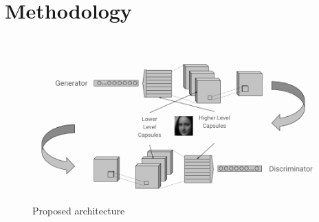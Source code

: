 \chapter{Methodology}\label{ch:methodology}
\begin{figure}[H]
\centering\includegraphics[width=1\textwidth]{images/methodology.png}
\caption{Proposed architecture}
\end{figure}